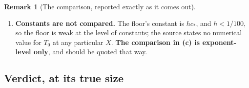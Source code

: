 \documentclass[11pt]{article}
\theoremstyle{definition}
\newtheorem{remark}[theorem]{Remark}
\theoremstyle{remark}
\begin{document}
\begin{remark}[The comparison, reported exactly as it comes out]
\begin{enumerate}[label=(\alph*),leftmargin=2.2em]
{      momentum at full leading order}, which is precisely why breaking
      axisymmetry is not an optional convenience of the construction.
    \item \textbf{Constants are not compared.} The floor's constant is
      $hc_*$, and $h<1/100$, so the floor is weak at the level of constants;
      the source states no numerical value for $T_0$ at any particular $X$.
      \textbf{The comparison in (c) is exponent-level only}, and should be
      quoted that way.
  \end{enumerate}
\end{remark}

\subsection{Verdict, at its true size}
\label{subsec:wpt3-verdict}
\end{document}
